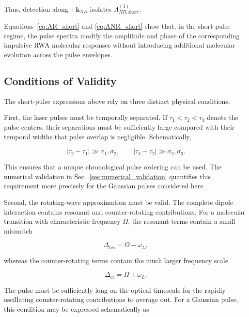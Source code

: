 \documentclass[11pt]{article}
\begin{document}
Thus, detection along $+\mathbf{k}_{NR}$ isolates
$A_{NR,\mathrm{short}}^{(3)}$.

Equations~\eqref{eq:AR_short} and
\eqref{eq:ANR_short} show that, in the short-pulse regime, the pulse
spectra modify the amplitude and phase of the corresponding impulsive
RWA molecular responses without introducing additional molecular
evolution across the pulse envelopes.


\subsection{Conditions of Validity}
\label{subsec:short_pulse_validity}

The short-pulse expressions above rely on three distinct physical
conditions.

First, the laser pulses must be temporally separated. If
$\tau_1<\tau_2<\tau_3$ denote the pulse centers, their separations must
be sufficiently large compared with their temporal widths that pulse
overlap is negligible. Schematically,

\begin{equation}
|\tau_2-\tau_1|
\gg
\sigma_1,\sigma_2,
\qquad
|\tau_3-\tau_2|
\gg
\sigma_2,\sigma_3.
\end{equation}

This ensures that a unique chronological pulse ordering can be used.
The numerical validation in Sec.~\ref{sec:numerical_validation}
quantifies this requirement more precisely for the Gaussian pulses
considered here.

Second, the rotating-wave approximation must be valid. The complete
dipole interaction contains resonant and counter-rotating
contributions. For a molecular transition with characteristic
frequency $\Omega$, the resonant terms contain a small mismatch

\begin{equation}
\Delta_{\mathrm{res}}
=
\Omega-\omega_L,
\end{equation}

whereas the counter-rotating terms contain the much larger frequency
scale

\begin{equation}
\Delta_{\mathrm{cr}}
=
\Omega+\omega_L.
\end{equation}

The pulse must be sufficiently long on the optical timescale for the
rapidly oscillating counter-rotating contributions to average out. For
a Gaussian pulse, this condition may be expressed schematically as
\end{document}
